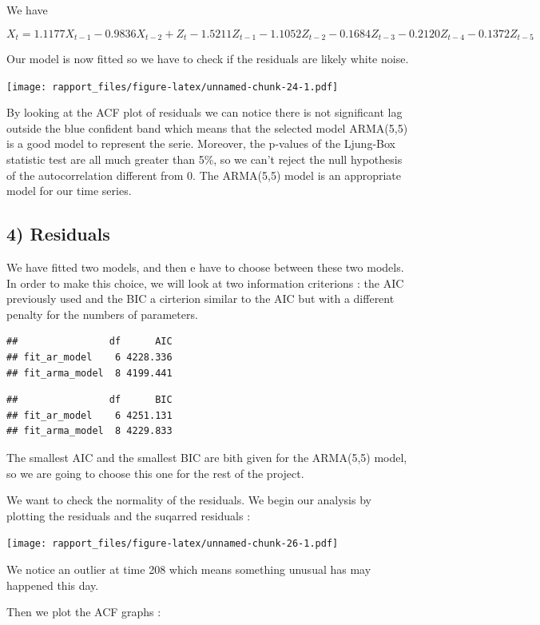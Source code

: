 \documentclass[]{article}
\begin{document}
We have

\[
X_t= 1.1177X_{t-1} - 0.9836X_{t-2} + Z_{t} - 1.5211Z_{t-1} - 1.1052Z_{t-2} - 0.1684Z_{t-3} - 0.2120Z_{t-4} - 0.1372Z_{t-5}
\]

Our model is now fitted so we have to check if the residuals are likely
white noise.

\texttt{[image: rapport\_files/figure-latex/unnamed-chunk-24-1.pdf]}

By looking at the ACF plot of residuals we can notice there is not
significant lag outside the blue confident band which means that the
selected model ARMA(5,5) is a good model to represent the serie.
Moreover, the p-values of the Ljung-Box statistic test are all much
greater than 5\%, so we can't reject the null hypothesis of the
autocorrelation different from 0. The ARMA(5,5) model is an appropriate
model for our time series.

\subsection{4) Residuals}

We have fitted two models, and then e have to choose between these two
models. In order to make this choice, we will look at two information
criterions : the AIC previously used and the BIC a cirterion similar to
the AIC but with a different penalty for the numbers of parameters.

\begin{verbatim}
##                df      AIC
## fit_ar_model    6 4228.336
## fit_arma_model  8 4199.441
\end{verbatim}

\begin{verbatim}
##                df      BIC
## fit_ar_model    6 4251.131
## fit_arma_model  8 4229.833
\end{verbatim}

The smallest AIC and the smallest BIC are bith given for the ARMA(5,5)
model, so we are going to choose this one for the rest of the project.

We want to check the normality of the residuals. We begin our analysis
by plotting the residuals and the suqarred residuals :

\texttt{[image: rapport\_files/figure-latex/unnamed-chunk-26-1.pdf]}

We notice an outlier at time 208 which means something unusual has may
happened this day.

Then we plot the ACF graphs :
\end{document}
